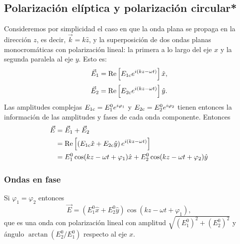\subsection{Polarización elíptica y polarización circular*}
Consideremos por simplicidad el caso en que la onda plana se propaga en la dirección $z$, es decir, $\vec{k}=k\hat{z}$, y la superposición de dos ondas planas monocromáticas con polarización lineal: la primera a lo largo del eje $x$ y la segunda paralela al eje $y$. Esto es:
\begin{equation}
\vec{E}_1=\operatorname{Re}\left[E_{1\rm c} e^{i(kz-\omega t)}\right]\hat{x},
\end{equation}
\begin{equation}
\vec{E}_2=\operatorname{Re}\left[E_{2\rm c} e^{i(kz-\omega t)}\right]\hat{y}.
\end{equation}
Las amplitudes complejas $E_{1\rm c}=E_{1}^0e^{i\varphi_1}$ y $E_{2\rm c}=E_{2}^0e^{i\varphi_2}$ tienen entonces la información de las amplitudes y fases de cada onda componente. Entonces
\begin{align}
\vec{E} &= \vec{E}_1+\vec{E}_2 \\
&= \operatorname{Re}\left[\left(E_{1\rm c}\hat{x}+E_{2\rm c}\hat{y}\right) e^{i(kz-\omega t)}\right] \label{E12-2} \\
&= E_{1}^0\cos(kz-\omega t+\varphi_1)\hat{x} + E_{2}^0\cos(kz-\omega t+\varphi_2)\hat{y}
\end{align}

\subsubsection{Ondas en fase}
 Si $\varphi_1=\varphi_2$ entonces
\begin{equation}
\vec{E} = (E_{1}^0\hat{x}+E_{2}^0\hat{y})\cos(kz-\omega t+\varphi_1),
\end{equation}
que es una onda con polarización lineal con amplitud $\sqrt{(E_{1}^0)^2+(E_{2}^0)^2}$ y ángulo $\arctan(E_{2}^0/E_{1}^0)$ respecto al eje $x$.

